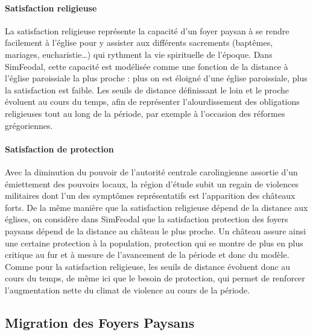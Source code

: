 \paragraph{Satisfaction religieuse}

La satisfaction religieuse représente la capacité d'un foyer paysan à se rendre facilement à l'église pour y assister aux différents sacrements (baptêmes, mariages, eucharistie\ldots) qui rythment la vie spirituelle de l'époque.
Dans SimFeodal, cette capacité est modélisée comme une fonction de la distance à l'église paroissiale la plus proche : plus on est éloigné d'une église paroissiale, plus la satisfaction est faible.
Les seuils de distance définissant le \og loin\fg{} et le \og proche\fg{} évoluent au cours du temps, afin de représenter l'alourdissement des obligations religieuses tout au long de la période, par exemple à l'occasion des réformes grégoriennes.

\paragraph{Satisfaction de \og protection\fg{}}

Avec la diminution du pouvoir de l'autorité centrale carolingienne assortie d'un émiettement des pouvoirs locaux, la région d'étude subit un regain de violences militaires dont l'un des symptômes représentatifs est l'apparition des châteaux forts.
De la même manière que la satisfaction religieuse dépend de la distance aux églises, on considère dans SimFeodal que la satisfaction \og protection\fg{} des foyers paysans dépend de la distance au château le plus proche.
Un château assure ainsi une certaine protection à la population, protection qui se montre de plus en plus critique au fur et à mesure de l'avancement de la période et donc du modèle.
Comme pour la satisfaction religieuse, les seuils de distance évoluent donc au cours du temps, de même ici que le \og besoin de protection\fg{}, qui permet de renforcer l'augmentation nette du climat de violence au cours de la période.

\subsection{Migration des Foyers Paysans \label{meca-migration}}

